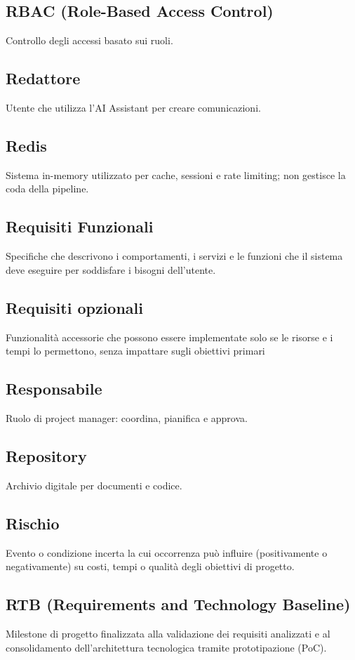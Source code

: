 \documentclass[a4paper,12pt]{article}
\begin{document}
\subsection{RBAC (Role-Based Access Control)}
Controllo degli accessi basato sui ruoli.

\subsection{Redattore}
Utente che utilizza l'AI Assistant per creare comunicazioni.

\subsection{Redis}
Sistema in-memory utilizzato per cache, sessioni e rate limiting; non gestisce la coda della pipeline.

\subsection{Requisiti Funzionali}
Specifiche che descrivono i comportamenti, i servizi e le funzioni che il sistema deve eseguire per soddisfare i bisogni dell'utente.

\subsection{Requisiti opzionali}
Funzionalità accessorie che possono essere implementate solo se le risorse e i tempi lo permettono, senza impattare sugli obiettivi primari

\subsection{Responsabile}
Ruolo di project manager: coordina, pianifica e approva.

\subsection{Repository}
Archivio digitale per documenti e codice.

\subsection{Rischio}
 Evento o condizione incerta la cui occorrenza può influire (positivamente o negativamente) su costi, tempi o qualità degli obiettivi di progetto.

\subsection{RTB (Requirements and Technology Baseline)}
Milestone di progetto finalizzata alla validazione dei requisiti analizzati e al consolidamento dell'architettura tecnologica tramite prototipazione (PoC).
\end{document}

